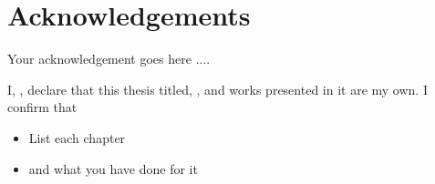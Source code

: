 \documentclass[
11pt, %
oneside, %
english, %
onehalfspacing, %
]{McMasterThesis} %
\begin{document}



\section*{\Huge \centering Acknowledgements}
\vspace{20pt}

\hspace{\parindent}Your acknowledgement goes here ....


\clearpage


\tableofcontents %

\listoffigures %

\listoftables %


\begin{declaration}

\noindent I, \authorname, declare that this thesis titled, \textbf{\ttitle}, and works presented in it are my own. I confirm that 

\begin{itemize} 
\item List each chapter
\item and what you have done for it
\end{itemize}
 
\end{declaration}

\label{lastoffront}
\clearpage
\end{document}

